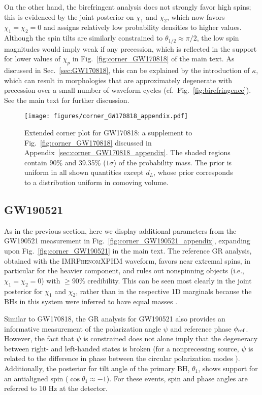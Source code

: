 \documentclass[aps,prd,twocolumn,superscriptaddress,preprintnumbers,floatfix,nofootinbib]{revtex4-2}
\begin{document}
On the other hand, the birefringent analysis does not strongly favor high spins; this is evidenced by the joint posterior on $\chi_1$ and $\chi_2$, which now favors $\chi_1 = \chi_2 = 0$ and assigns relatively low probability densities to higher values.
Although the spin tilts are similarly constrained to $\theta_{1/2} \approx \pi/2$, the low spin magnitudes would imply weak if any precession, which is reflected in the support for lower values of $\chi_p$ in Fig.~\ref{fig:corner_GW170818} of the main text.
As discussed in Sec.~\ref{sec:GW170818}, this can be explained by the introduction of $\kappa$, which can result in morphologies that are approximately degenerate with precession over a small number of waveform cycles (cf.~Fig.~\ref{fig:birefringence}).
See the main text for further discussion.

\begin{figure*}[h]
    \texttt{[image: figures/corner\_GW170818\_appendix.pdf]}
    \caption{
        Extended corner plot for GW170818: a supplement to Fig.~\ref{fig:corner_GW170818} discussed in Appendix~\ref{sec:corner_GW170818_appendix}.
        The shaded regions contain 90\% and 39.35\% ($1\sigma$) of the probability mass.
        The prior is uniform in all shown quantities except $d_L$, whose prior corresponds to a distribution uniform in comoving volume.
    }
    \label{fig:corner_GW170818_appendix}
\end{figure*}

\subsection{GW190521}
\label{sec:corner_GW190521_appendix}

As in the previous section, here we display additional parameters from the GW190521 measurement in Fig.~\ref{fig:corner_GW190521_appendix}, expanding upon Fig.~\ref{fig:corner_GW190521} in the main text.
The reference \ac{GR} analysis, obtained with the \textsc{IMRPhenomXPHM} waveform, favors near extremal spins, in particular for the heavier component, and rules out nonspinning objects (i.e., $\chi_1 = \chi_2 = 0$) with $\geq 90\%$ credibility.
This can be seen most clearly in the joint posterior for $\chi_1$ and $\chi_2$, rather than in the respective 1D marginals because the \acp{BH} in this system were inferred to have equal masses \cite{Biscoveanu:2020are}.

Similar to GW170818, the \ac{GR} analysis for GW190521 also provides an informative measurement of the polarization angle $\psi$ and reference phase $\phi_{\rm ref}$.
However, the fact that $\psi$ is constrained does not alone imply that the degeneracy between right- and left-handed states is broken (for a nonprecessing source, $\psi$ is related to the difference in phase between the circular polarization modes \cite{Isi:2022mbx}).
Additionally, the posterior for tilt angle of the primary \ac{BH}, $\theta_1$, shows support for an antialigned spin ($\cos\theta_1 \approx -1$).
For these events, spin and phase angles are referred to 10 Hz at the detector.
\end{document}
